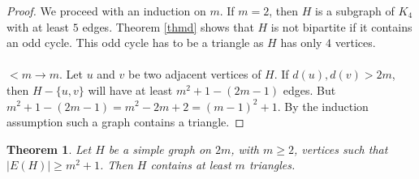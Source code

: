 \documentclass[12pt,a4paper]{article}
\newtheorem{thm}{Theorem}[section]
\theoremstyle{definition}
\begin{document}
\begin{proof}
We proceed with an induction on $m$. If $m=2$, then $H$ is a subgraph of $K_4$ with at least $5$ edges. Theorem \ref{thmd}  shows that $H$ is not bipartite if it contains an odd cycle. This odd cycle has to be a triangle as $H$ has only $4$ vertices. \\
\\
$<m \to m$. Let $u$ and $v$ be two adjacent vertices of $H$. If $d(u),d(v) >2m$, then $H- \{u,v\}$ will have at least $m^2+1-(2m-1)$ edges. But $m^2+1-(2m-1)=m^2-2m+2=(m-1)^2+1$. By the induction assumption such a graph contains a triangle.
\end{proof}
\begin{thm} Let $H$ be a simple graph on $2m$, with $m \geq 2$, vertices such that $|E(H)| \geq m^2+1$. Then $H$ contains at least $m$ triangles. 
\end{thm}
\end{document}
